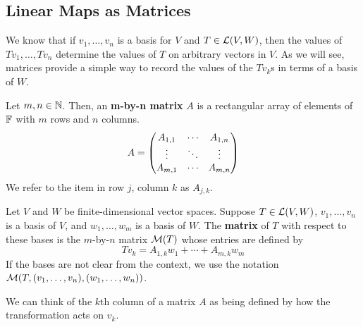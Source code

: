 \subsection*{Linear Maps as Matrices}
We know that if $v_1, \dots, v_n$ is a basis for $V$ and $T\in \mathcal{L}(V,W)$, then the values of $Tv_1, \dots, Tv_n$ determine the values of $T$ on arbitrary vectors in $V$. As we will see, matrices provide a simple way to record the values of the $Tv_k$s in terms of a basis of $W$.
\begin{definition}[Matrix, $A_{j,k}$]
    Let $m,n\in\mathbb{N}$. Then, an \textbf{m-by-n matrix} $A$ is a rectangular array of elements of $\mathbb F$ with $m$ rows and $n$ columns.
    \[ A = \begin{pmatrix}A_{1,1} & \cdots & A_{1,n} \\
                 \vdots & \ddots & \vdots \\
                 A_{m,1} & \cdots & A_{m,n}\end{pmatrix}\]
    We refer to the item in row $j$, column $k$ as $A_{j,k}$.
\end{definition}
\begin{definition}
    Let $V$ and $W$ be finite-dimensional vector spaces. Suppose $T\in\mathcal{L}(V,W)$, $v_1, \dots, v_n$ is a basis of $V$, and $w_1, \dots, w_m$ is a basis of $W$. The \textbf{matrix} of $T$ with respect to these bases is the $m$-by-$n$ matrix $\mathcal{M} (T)$ whose entries are defined by
    \[ Tv_k = A_{1,k}w_1 + \cdots + A_{m,k}w_m \]
    If the bases are not clear from the context, we use the notation $\mathcal{M} (T, (v_1, \dots, v_n), (w_1, \dots, w_n))$.
\end{definition}
We can think of the $k$th column of a matrix $A$ as being defined by how the transformation acts on $v_k$.
